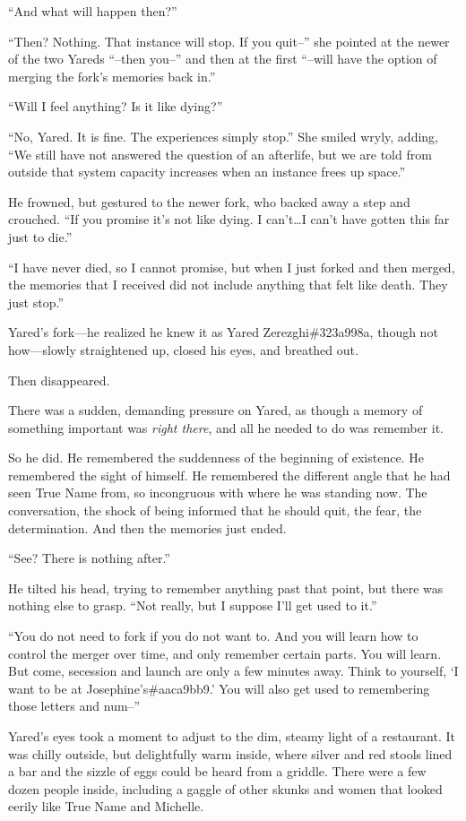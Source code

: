 ``And what will happen then?''

``Then? Nothing. That instance will stop. If you quit--'' she pointed at the newer of the two Yareds ``--then you--'' and then at the first ``--will have the option of merging the fork's memories back in.''

``Will I feel anything? Is it like dying?''

``No, Yared. It is fine. The experiences simply stop.'' She smiled wryly, adding, ``We still have not answered the question of an afterlife, but we are told from outside that system capacity increases when an instance frees up space.''

He frowned, but gestured to the newer fork, who backed away a step and crouched. ``If you promise it's not like dying. I can't\ldots I can't have gotten this far just to die.''

``I have never died, so I cannot promise, but when I just forked and then merged, the memories that I received did not include anything that felt like death. They just stop.''

Yared's fork---he realized he knew it as Yared Zerezghi\#323a998a, though not how---slowly straightened up, closed his eyes, and breathed out.

Then disappeared.

There was a sudden, demanding pressure on Yared, as though a memory of something important was \emph{right there}, and all he needed to do was remember it.

So he did. He remembered the suddenness of the beginning of existence. He remembered the sight of himself. He remembered the different angle that he had seen True Name from, so incongruous with where he was standing now. The conversation, the shock of being informed that he should quit, the fear, the determination. And then the memories just ended.

``See? There is nothing after.''

He tilted his head, trying to remember anything past that point, but there was nothing else to grasp. ``Not really, but I suppose I'll get used to it.''

``You do not need to fork if you do not want to. And you will learn how to control the merger over time, and only remember certain parts. You will learn. But come, secession and launch are only a few minutes away. Think to yourself, `I want to be at Josephine's\#aaca9bb9.' You will also get used to remembering those letters and num--''

Yared's eyes took a moment to adjust to the dim, steamy light of a restaurant. It was chilly outside, but delightfully warm inside, where silver and red stools lined a bar and the sizzle of eggs could be heard from a griddle. There were a few dozen people inside, including a gaggle of other skunks and women that looked eerily like True Name and Michelle.

